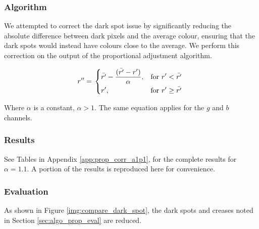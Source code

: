 \subsubsection*{Algorithm}
We attempted to correct the dark spot issue by significantly reducing the absolute difference between dark pixels and the average colour, ensuring that the dark spots would instead have colours close to the average. We perform this correction on the output of the proportional adjustment algorithm.

\begin{equation} \label{eq:prop_corr_algo}
  r'' = \left.
  \begin{dcases}
    \displaystyle \bar{r'} - \frac{(\bar{r'} - r')}{\alpha}, & \text{for } r' < \bar{r'} \\
    \displaystyle r', & \text{for } r' \geq \bar{r'} \\
  \end{dcases}
  \right.\\
\end{equation}


Where $\alpha$ is a constant, $\alpha  > 1$. The same equation applies for the $g$ and $b$ channels.

\subsubsection*{Results}
See Tables in Appendix \ref{app:prop_corr_a1p1}, for the complete results for $\alpha = 1.1$. A portion of the results is reproduced here for convenience.


\subsubsection*{Evaluation}
As shown in Figure \ref{img:compare_dark_spot}, the dark spots and creases noted in Section \ref{sec:algo_prop_eval} are reduced.


